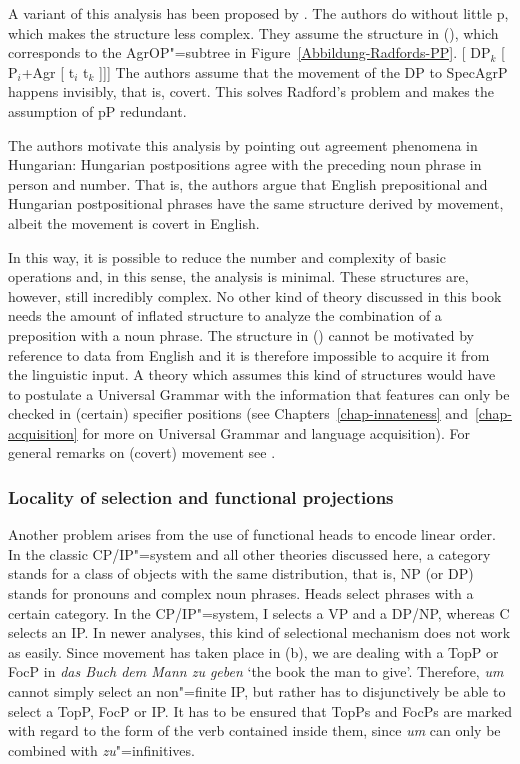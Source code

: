 A variant of this analysis has been proposed by \citet*[]{HNG2005a}. The authors do without little p, which makes the structure
less complex. They assume the structure in (), which corresponds to the AgrOP"=subtree in Figure~\ref{Abbildung-Radfords-PP}.
\ea
{}[ DP$_k$ [ P$_i$+Agr [ t$_i$ t$_k$ ]]]
\z
The authors assume that the movement of the DP to SpecAgrP happens invisibly, that is,
covert. This solves Radford's problem and makes the assumption of pP redundant. 

The authors motivate this analysis by pointing out agreement phenomena in Hungarian: Hungarian
postpositions agree with the preceding noun phrase in person and number. That is, the authors argue that English prepositional
and Hungarian postpositional phrases have the same structure derived by movement, albeit the
movement is covert in English.

In this way, it is possible to reduce the number and complexity of basic operations and, in this sense, the analysis is minimal. These structures
are, however, still incredibly complex. No other kind of theory discussed in this book needs the amount of inflated structure to analyze the combination
of a preposition with a noun phrase. The structure in () cannot be motivated by reference to
data from English and it is therefore impossible to acquire it from the linguistic input. A theory
which assumes this kind of structures would have to postulate a Universal Grammar with
the information that features can only be checked in (certain) specifier positions (see Chapters~\ref{chap-innateness} 
and~\ref{chap-acquisition} for more on Universal Grammar and language acquisition). For general
remarks on (covert) movement see .

\subsubsection{Locality of selection and functional projections}

Another problem arises from the use of functional heads to encode linear order. In the classic
CP/IP"=system and all other theories discussed here, a category stands for a class of objects with
the same distribution, that is, NP (or DP) stands for pronouns and complex noun phrases. Heads
select phrases with a certain category. In the CP/IP"=system, I selects a VP and a DP/NP, whereas C
selects an IP. In newer analyses, this kind of selectional mechanism does not work as easily. Since
movement has taken place in (b), we are dealing with a TopP or FocP in \emph{das Buch dem
  Mann zu geben} `the book the man to give'.  Therefore, \emph{um} cannot simply select an
non"=finite IP, but rather has to disjunctively be able to select a TopP, FocP or IP. It has to be
ensured that TopPs and FocPs are marked with regard to the form of the verb contained inside them,
since \emph{um} can only be combined with \emph{zu}"=infinitives.


